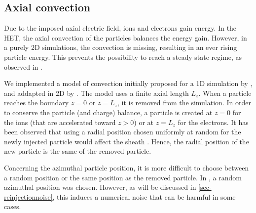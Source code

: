 \subsection{Axial convection}

Due to the imposed axial electric field, ions and electrons gain energy.
In the \ac{HET}, the axial convection of the particles balances the energy gain.
However, in a purely \ac{2D} simulations, the convection is missing, resulting in an ever rising particle energy.
This prevents the possibility to reach a steady state regime, as observed in \citet{heron2013,janhunen2018}.

We implemented a model of convection initially proposed for a \ac{1D} simulation by \citet{lafleur2016a}, and addapted in \ac{2D} by \citet{croes2017a}.
The model uses a finite axial length $L_z$.
When a particle reaches the boundary $z=0$ or $z=L_z$, it is removed from the simulation.
In order to conserve the particle (and charge) balance, a particle is created at $z=0$ for the ions (that are accelerated toward $z>0$) or at $z=L_z$ for the electrons.
It has been observed that using a radial position chosen uniformly at random for the newly injected particle would affect the sheath \citep{croes2017a}.
Hence, the radial position of the new particle is the same of the removed particle.

Concerning the azimuthal particle position, it is more difficult to choose between a random position or the same position as the removed particle.
In \citet{lafleur2016a,croes2017a}, a random azimuthal position was chosen.
However, as will be discussed in \cref{sec-reinjectionnoise}, this induces a numerical noise that can be harmful in some cases.
